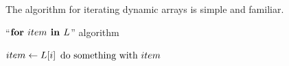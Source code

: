 \HdrDynArrayImpl

The algorithm for iterating dynamic arrays is simple and familiar.

\begin{algorithm}[H]
	\caption{``$\textbf{for } item \textbf{ in } L$'' algorithm \TextDynamicArray}
	\begin{algorithmic}
			\State $item \gets L[i]$
			\State $\text{do something with } item$
		\EndFor
	\end{algorithmic}
\end{algorithm}